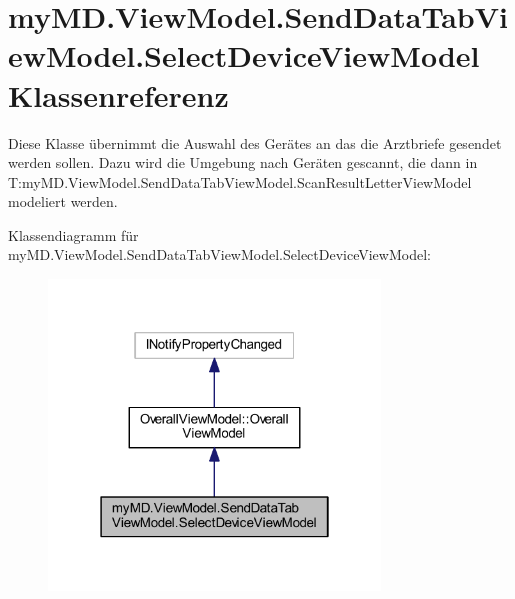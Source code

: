 \hypertarget{classmy_m_d_1_1_view_model_1_1_send_data_tab_view_model_1_1_select_device_view_model}{}\section{my\+M\+D.\+View\+Model.\+Send\+Data\+Tab\+View\+Model.\+Select\+Device\+View\+Model Klassenreferenz}
\label{classmy_m_d_1_1_view_model_1_1_send_data_tab_view_model_1_1_select_device_view_model}


Diese Klasse übernimmt die Auswahl des Gerätes an das die Arztbriefe gesendet werden sollen. Dazu wird die Umgebung nach Geräten gescannt, die dann in T\+:my\+M\+D.\+View\+Model.\+Send\+Data\+Tab\+View\+Model.\+Scan\+Result\+Letter\+View\+Model modeliert werden.  




Klassendiagramm für my\+M\+D.\+View\+Model.\+Send\+Data\+Tab\+View\+Model.\+Select\+Device\+View\+Model\+:
\nopagebreak
\begin{figure}[H]
\begin{center}
\leavevmode
\includegraphics[width=250pt]{classmy_m_d_1_1_view_model_1_1_send_data_tab_view_model_1_1_select_device_view_model__inherit__graph}
\end{center}
\end{figure}


